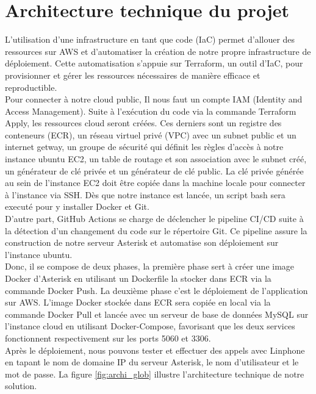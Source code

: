 \section{Architecture technique du projet}
L’utilisation d’une infrastructure en tant que code (IaC) permet d’allouer des ressources sur AWS et d’automatiser la création de notre propre infrastructure de déploiement. Cette automatisation s’appuie sur Terraform, un outil d’IaC, pour provisionner et gérer les ressources nécessaires de manière efficace et reproductible.\\
Pour connecter à notre cloud public, Il nous faut un compte
IAM (Identity and Access Management). Suite à l’exécution du code via la commande Terraform Apply, les ressources cloud seront créées. Ces derniers sont un registre des conteneurs (ECR), un réseau virtuel privé (VPC) avec un subnet public et un internet getway, un groupe de sécurité qui définit les règles d’accès à notre instance ubuntu EC2, un table de routage et son association avec le subnet créé, un générateur de clé privée et un générateur de clé public. La clé privée générée au sein de l’instance EC2 doit être copiée dans la machine locale pour connecter à l’instance via SSH. Dès que notre instance est lancée, un script bash sera executé pour y installer Docker et Git.\\ D'autre part, GitHub Actions se charge de déclencher le pipeline CI/CD suite à la détection d'un changement du code sur le répertoire Git. Ce pipeline assure la construction de notre serveur Asterisk et automatise son déploiement sur l'instance ubuntu. \\Donc, il se compose de deux phases, la première phase sert à créer une image Docker d'Asterisk en utilisant un Dockerfile la stocker dans ECR via la commande Docker Push. La deuxième phase c'est le déploiement de l'application sur AWS. L'image Docker stockée dans ECR sera copiée en local via la commande Docker Pull et lancée avec un serveur de base de données MySQL sur l'instance cloud en utilisant Docker-Compose, favorisant que les deux services fonctionnent respectivement sur les ports 5060 et 3306.\\ Après le déploiement, nous pouvons tester et effectuer des appels avec Linphone en tapant le nom de domaine IP du serveur Asterisk, le nom d'utilisateur et le mot de passe. La figure \ref{fig:archi_glob} illustre l'architecture technique de notre solution.
